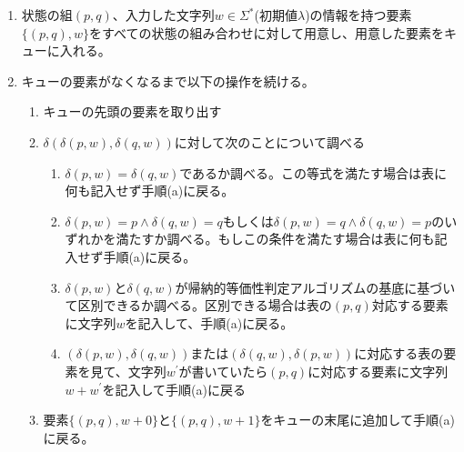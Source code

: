 \documentclass[uplatex,dvipdfmx,a4paper,10pt]{jsarticle}
\begin{document}
    \begin{enumerate}
      \item 状態の組\((p, q)\)、入力した文字列\(w \in \Sigma^{*}\)(初期値\(\lambda\))の情報を持つ要素\(\{(p, q), w\}\)をすべての状態の組み合わせに対して用意し、用意した要素をキューに入れる。
      \item キューの要素がなくなるまで以下の操作を続ける。
      \begin{enumerate}
        \item キューの先頭の要素を取り出す
        \item \(\delta(\delta(p, w), \delta(q, w))\)に対して次のことについて調べる
        \begin{enumerate}
          \item \(\delta(p, w) = \delta(q, w)\)であるか調べる。この等式を満たす場合は表に何も記入せず手順(a)に戻る。
          \item \(\delta(p, w) = p \land \delta(q, w) = q\)もしくは\(\delta(p, w) = q \land \delta(q, w) = p\)のいずれかを満たすか調べる。もしこの条件を満たす場合は表に何も記入せず手順(a)に戻る。
          \item \(\delta(p, w)\)と\(\delta(q, w)\)が帰納的等価性判定アルゴリズムの基底に基づいて区別できるか調べる。区別できる場合は表の\((p, q)\)対応する要素に文字列\(w\)を記入して、手順(a)に戻る。
          \item \((\delta(p, w), \delta(q, w))\)または\((\delta(q, w), \delta(p, w))\)に対応する表の要素を見て、文字列\(w^{'}\)が書いていたら\((p, q)\)に対応する要素に文字列\(w + w^{'}\)を記入して手順(a)に戻る
        \end{enumerate}
        \item 要素\(\{(p, q), w + 0\}\)と\(\{(p, q), w + 1\}\)をキューの末尾に追加して手順(a)に戻る。
      \end{enumerate}
    \end{enumerate}

    
    
    \appendix
    \setcounter{figure}{0}
    \setcounter{table}{0}
    \renewcommand{\thetable}{\Alph{section}\arabic{table}}
    \renewcommand{\thefigure}{\Alph{section}\arabic{figure}}
    \makeatletter 
    \newcommand{\section@cntformat}{付録 \thesection:\ }
    \makeatother
    
    
\end{document}
